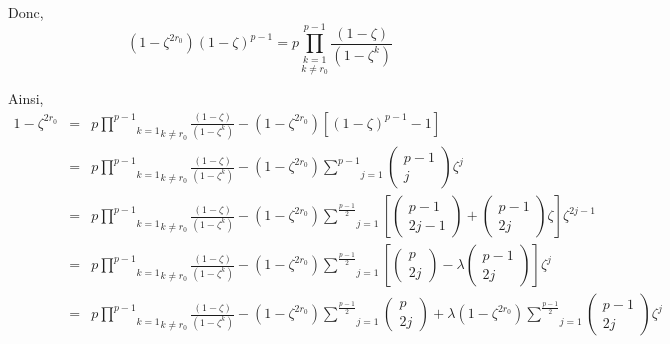 Donc,
\[ (1 - \zeta^{2 r_0}) (1 - \zeta)^{p - 1} = p  \underset{k \neq
   r_0}{\underset{k = 1}{\overset{p - 1}{\prod}}} \frac{(1 - \zeta)}{(1 -
   \zeta^k)} \]


Ainsi,
\begin{eqnarray*}
  1 - \zeta^{2 r_0} & = & p  \underset{k \neq r_0}{\underset{k = 1}{\overset{p
  - 1}{\prod}}} \frac{(1 - \zeta)}{(1 - \zeta^k)} - (1 - \zeta^{2 r_0}) [(1 -
  \zeta)^{p - 1} - 1]\\
  & = & p  \underset{k \neq r_0}{\underset{k = 1}{\overset{p - 1}{\prod}}}
  \frac{(1 - \zeta)}{(1 - \zeta^k)} - (1 - \zeta^{2 r_0}) \underset{j =
  1}{\overset{p - 1}{\sum}} \left( \begin{array}{c}
    p - 1\\
    j
  \end{array} \right) \zeta^j\\
  & = & p  \underset{k \neq r_0}{\underset{k = 1}{\overset{p - 1}{\prod}}}
  \frac{(1 - \zeta)}{(1 - \zeta^k)} - (1 - \zeta^{2 r_0}) \underset{j =
  1}{\overset{\frac{p - 1}{2}}{\sum}} \left[ \left( \begin{array}{c}
    p - 1\\
    2 j - 1
  \end{array} \right) + \left( \begin{array}{c}
    p - 1\\
    2 j
  \end{array} \right) \zeta \right] \zeta^{2 j - 1}\\
  & = & p  \underset{k \neq r_0}{\underset{k = 1}{\overset{p - 1}{\prod}}}
  \frac{(1 - \zeta)}{(1 - \zeta^k)} - (1 - \zeta^{2 r_0}) \underset{j =
  1}{\overset{\frac{p - 1}{2}}{\sum}} \left[ \left( \begin{array}{c}
    p\\
    2 j
  \end{array} \right) - \lambda \left( \begin{array}{c}
    p - 1\\
    2 j
  \end{array} \right) \right] \zeta^j\\
  & = & p  \underset{k \neq r_0}{\underset{k = 1}{\overset{p - 1}{\prod}}}
  \frac{(1 - \zeta)}{(1 - \zeta^k)} - (1 - \zeta^{2 r_0}) \underset{j =
  1}{\overset{\frac{p - 1}{2}}{\sum}} \left( \begin{array}{c}
    p\\
    2 j
  \end{array} \right) + \lambda (1 - \zeta^{2 r_0}) \underset{j =
  1}{\overset{\frac{p - 1}{2}}{\sum}} \left( \begin{array}{c}
    p - 1\\
    2 j
  \end{array} \right) \zeta^j
\end{eqnarray*}


